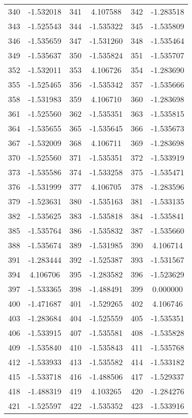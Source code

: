 \documentclass[12pt]{article}
\begin{document}
\begin{longtable}{@{}cc|cc|cc@{}}
340 & -1.532018 & 341 & 4.107588 & 342 & -1.283518 \\
343 & -1.525543 & 344 & -1.535322 & 345 & -1.535809 \\
346 & -1.535659 & 347 & -1.531260 & 348 & -1.535464 \\
349 & -1.535637 & 350 & -1.535824 & 351 & -1.535707 \\
352 & -1.532011 & 353 & 4.106726 & 354 & -1.283690 \\
355 & -1.525465 & 356 & -1.535342 & 357 & -1.535666 \\
358 & -1.531983 & 359 & 4.106710 & 360 & -1.283698 \\
361 & -1.525560 & 362 & -1.535351 & 363 & -1.535815 \\
364 & -1.535655 & 365 & -1.535645 & 366 & -1.535673 \\
367 & -1.532009 & 368 & 4.106711 & 369 & -1.283698 \\
370 & -1.525560 & 371 & -1.535351 & 372 & -1.533919 \\
373 & -1.535586 & 374 & -1.533258 & 375 & -1.535471 \\
376 & -1.531999 & 377 & 4.106705 & 378 & -1.283596 \\
379 & -1.523631 & 380 & -1.535163 & 381 & -1.533135 \\
382 & -1.535625 & 383 & -1.535818 & 384 & -1.535841 \\
385 & -1.535764 & 386 & -1.535832 & 387 & -1.535660 \\
388 & -1.535674 & 389 & -1.531985 & 390 & 4.106714 \\
391 & -1.283444 & 392 & -1.525387 & 393 & -1.531567 \\
394 & 4.106706 & 395 & -1.283582 & 396 & -1.523629 \\
397 & -1.533365 & 398 & -1.488491 & 399 & 0.000000 \\
400 & -1.471687 & 401 & -1.529265 & 402 & 4.106746 \\
403 & -1.283684 & 404 & -1.525559 & 405 & -1.535351 \\
406 & -1.533915 & 407 & -1.535581 & 408 & -1.535828 \\
409 & -1.535840 & 410 & -1.535843 & 411 & -1.535768 \\
412 & -1.533933 & 413 & -1.535582 & 414 & -1.533182 \\
415 & -1.533718 & 416 & -1.488506 & 417 & -1.529337 \\
418 & -1.488319 & 419 & 4.103265 & 420 & -1.284276 \\
421 & -1.525597 & 422 & -1.535352 & 423 & -1.533916 \\

\end{longtable}
\end{document}
